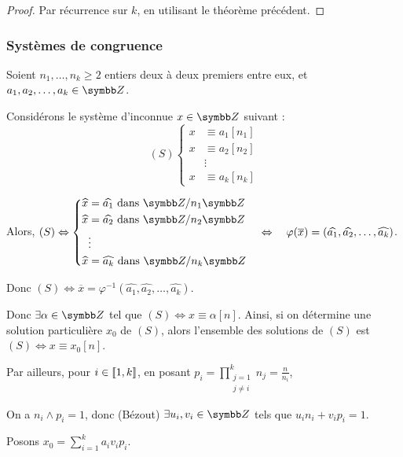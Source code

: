 \begin{proof}
    Par récurrence sur $k$, en utilisant le théorème précédent.
\end{proof}

\subsubsection{Systèmes de congruence}

Soient $n_1, \ldots, n_k \geqslant 2$ entiers deux à deux premiers entre eux, et 
$a_1, a_2, \ldots, a_k \in \Z$.

Considérons le système d'inconnue $x \in \Z$ suivant :
\[
    (S) \left\{ 
        \begin{aligned}
            x & \equiv a_1 [n_1] \\
            x & \equiv a_2 [n_2] \\
            & \vdots \\
            x & \equiv a_k [n_k]
        \end{aligned}
    \right.
\] 

Alors, $(S) \Leftrightarrow \left\{ 
    \begin{aligned}
        \widehat x & = \widehat{a_1} \text{ dans } \Z / n_1 \Z \\
        \widehat x & = \widehat{a_2} \text{ dans } \Z / n_2 \Z \\
        & \vdots \\
        \widehat x & = \widehat{a_k} \text{ dans } \Z / n_k \Z
    \end{aligned} \right. \quad \Leftrightarrow  \quad\varphi(\overline x) = (\widehat{a_1}, \widehat{a_2}, \ldots, \widehat{a_k})$.

Donc $(S) \Leftrightarrow \overline x = \varphi^{-1}(\widehat{a_1}, \widehat{a_2}, \ldots, \widehat{a_k})$.

Donc $\exists \alpha \in \Z$ tel que $(S) \Leftrightarrow x \equiv \alpha [n]$. Ainsi, si on détermine 
une solution particulière $x_0$ de $(S)$, alors l'ensemble des solutions de $(S)$ est 
$(S) \Leftrightarrow x \equiv x_0 [n]$.

Par ailleurs, pour $i \in [\![1, k]\!]$, en posant $\displaystyle p_i = \prod_{\substack{j = 1 \\ j \neq i}}^k n_j = \frac n {n_i}$,

On a $n_i \wedge p_i = 1$, donc (Bézout) $\exists u_i, v_i \in \Z$ tels que $u_i n_i + v_i p_i = 1$.

Posons $x_0 = \displaystyle \sum_{i = 1}^k a_i v_i p_i$.

